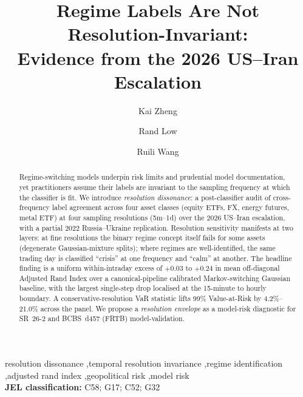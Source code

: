 \documentclass[preprint,12pt,authoryear]{elsarticle}
\def\corref#1{}%
\begin{document}
\begin{frontmatter}
\sloppy

\title{Regime Labels Are Not Resolution-Invariant:\\ Evidence from the 2026 US--Iran Escalation}

\author[1]{Kai Zheng}
\author[2]{Rand Low}
\author[1]{Ruili Wang\corref{cor1}}




\begin{abstract}
  Regime-switching models underpin risk limits and prudential model documentation, yet practitioners assume their labels are invariant to the sampling frequency at which the classifier is fit. We introduce \emph{resolution dissonance}: a post-classifier audit of cross-frequency label agreement across four asset classes (equity ETFs, FX, energy futures, metal ETF) at four sampling resolutions (5m--1d) over the 2026 US--Iran escalation, with a partial 2022 Russia--Ukraine replication. Resolution sensitivity manifests at two layers: at fine resolutions the binary regime concept itself fails for some assets (degenerate Gaussian-mixture splits); where regimes are well-identified, the same trading day is classified ``crisis'' at one frequency and ``calm'' at another. The headline finding is a uniform within-intraday excess of $+0.03$ to $+0.24$ in mean off-diagonal Adjusted Rand Index over a canonical-pipeline calibrated Markov-switching Gaussian baseline, with the largest single-step drop localised at the 15-minute to hourly boundary. A conservative-resolution VaR statistic lifts 99\% Value-at-Risk by 4.2\%--21.0\% across the panel. We propose a \emph{resolution envelope} as a model-risk diagnostic for SR~26-2 and BCBS~d457 (FRTB) model-validation.
\end{abstract}

\begin{keyword}
resolution dissonance \sep temporal resolution invariance \sep regime identification \sep adjusted rand index \sep geopolitical risk \sep model risk \\[2pt]
\textbf{JEL classification:} C58; G17; C52; G32
\end{keyword}

\end{frontmatter}
\sloppy  %
\end{document}

